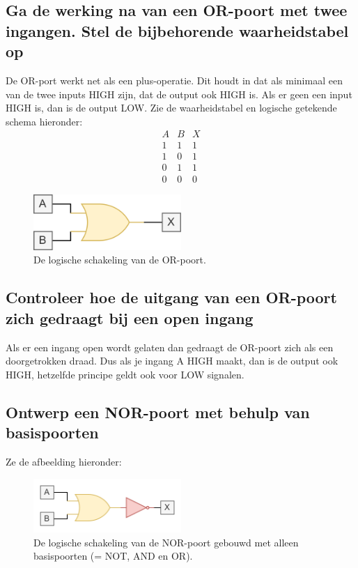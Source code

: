 \documentclass[12pt]{article}
\begin{document}
\subsection{Ga de werking na van een OR-poort met twee ingangen. Stel de bijbehorende waarheidstabel op}
De OR-port werkt net als een plus-operatie. Dit houdt in dat als minimaal een van de twee inputs HIGH zijn, dat de output ook HIGH is. Als er geen een input HIGH is, dan is de output LOW. 
Zie de waarheidstabel en logische getekende schema hieronder:
\begin{displaymath}
    \begin{array}{|c|c||c|}
    A & B & X \\ 
    \hline 
    1 & 1 & 1 \\
    1 & 0 & 1 \\
    0 & 1 & 1 \\
    0 & 0 & 0
    \end{array}
\end{displaymath}
\begin{figure}[h]
    \centering
    \includegraphics[width=0.5\textwidth]{OR-PORT.png}
    \caption{De logische schakeling van de OR-poort.}
    \label{fig:OR-PORT}
\end{figure}
\subsection{Controleer hoe de uitgang van een OR-poort zich gedraagt bij een open ingang}
Als er een ingang open wordt gelaten dan gedraagt de OR-poort zich als een doorgetrokken draad. Dus als je ingang A HIGH maakt, dan is de output ook HIGH, hetzelfde principe geldt ook voor LOW signalen. 
\subsection{Ontwerp een NOR-poort met behulp van basispoorten}
Ze de afbeelding hieronder:
\begin{figure}[h]
    \centering
    \includegraphics[width=0.5\textwidth]{NOR-PORT-BASISport.png}
    \caption{De logische schakeling van de NOR-poort gebouwd met alleen basispoorten (= NOT, AND en OR).}
    \label{fig:OR-PORT}
\end{figure}
\end{document}
